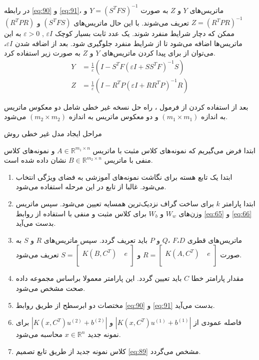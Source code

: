 در رابطه \ref{eq:90} و \ref{eq:91}، ماتریس‌های $Y$ و $Z$  به صورت  $Y={{({{S}^{T}}FS)}^{-1}}$ و  $Z={{({{R}^{T}}PR)}^{-1}}$ تعریف می‌شوند. با این حال ماتریس‌های $({{S}^{T}}FS)$ و $({{R}^{T}}PR)$  ممکن که دچار شرایط منفرد شوند. یک عدد ثابت بسیار کوچک  $\varepsilon I$ , $\varepsilon > 0$ به این ماتریس‌ها اضافه می‌شود تا از شرایط منفرد جلوگیری شود. بعد از اضافه شدن $\varepsilon I$، می‌توان از  برای پیدا کردن ماتریس‌های $Y$ و $Z$ به صورت زیر استفاده کرد.
\begin{align}
Y&= \frac{1}{\varepsilon }(I-{{S}^{T}}F{{(\varepsilon I+S{{S}^{T}}F)}^{-1}}S) \label{eq:92} \\
Z&= \frac{1}{\varepsilon }(I-{{R}^{T}}P{{(\varepsilon I+R{{R}^{T}}P)}^{-1}}R) \label{eq:93}
\end{align}

بعد از استفاده کردن از فرمول ، راه حل نسخه غیر خطی شامل دو معکوس ماتریس به اندازه  $(m_1 \times m_1)$ و دو معکوس ماتریس به اندازه $(m_2 \times m_2)$  می‌شود.

\begin{algo}
	مراحل ایجاد مدل غیر خطی روش  
	
	ابتدا فرض می‌گیریم که نمونه‌های کلاس مثبت با ماتریس  $A\in {{\mathbb{R}}^{{{m}_{1}}\times n}}$ و نمونه‌های کلاس منفی با ماتریس  $B\in {{\mathbb{R}}^{{{m}_{2}}\times n}}$ نشان داده شده است.
	
	\begin{enumerate}
		\item ابتدا یک تابع هسته برای نگاشت نمونه‌های آموزشی به فضای ویژگی انتخاب می‌شود. غالبا از تابع  در این مرحله استفاده می‌شود.
		\item ابتدا پارامتر  $k$ برای ساخت گراف نزدیک‌ترین همسایه تعیین می‌شود. سپس ماتریس وزن‌های  $W_{w}$ و   $W_{b}$ برای کلاس مثبت و منفی با استفاده از روابط \ref{eq:65} و \ref{eq:66} بدست می‌آید.
		\item ماتریس‌های قطری  $D$،$F$ ،$Q$  و $P$ باید تعریف گردد. سپس ماتریس‌های $R$ و  $S$ به صورت  $R=\left[ \begin{matrix} K(A,{{C}^{T}})\ & e  \\ \end{matrix} \right]$  و $S=\left[ \begin{matrix} K(B,{{C}^{T}})\ & e  \\ \end{matrix} \right]$  تعریف می‌شود.
		\item مقدار پارامتر خطا $C$ باید تعیین گردد. این پارامتر معمولا براساس مجموعه داده صحت  مشخص می‌شود.
		\item مختصات دو ابرسطح از طریق روابط \ref{eq:90} و \ref{eq:91} بدست می‌آید.
		\item فاصله عمودی از $|K(x,{C}^{T}){{u}^{(1)}}+{{b}^{(1)}}|$ و  $|K(x,{C}^{T}){{u}^{(2)}}+{{b}^{(2)}}|$ برای نمونه جدید  $x \in \mathbb{R}^{n}$ محاسبه می‌شود.
		\item کلاس نمونه جدید از طریق تابع تصمیم \ref{eq:89} مشخص می‌گردد.
	\end{enumerate}
\end{algo}

